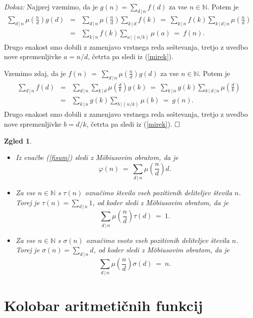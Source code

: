\documentclass[a4paper,12pt]{article}
\def\N{\mathbb{N}} %
\def\qed{$\hfill\Box$}   %
\newtheorem{zgled}{Zgled}
\begin{document}
\noindent
{\em Dokaz:\/} 
Najprej vzemimo, da je $g(n) = \sum_{d\,|\,n} f(d)$ za vse $n \in \N$. Potem je
\begin{eqnarray*}
\sum_{d\,|\,n} \mu\left(\frac{n}{d}\right)g(d)
 &=& \sum_{d\,|\,n} \mu\left(\frac{n}{d}\right)\sum_{k\,|\,d} f(k)
\ =\ \sum_{k\,|\,n} f(k) \sum_{k\,|\,d\,|\,n} \mu\left(\frac{n}{d}\right) \\
 &=& \sum_{k\,|\,n} f(k) \sum_{a\,|\,(n/k)} \mu\left(a\right)\ =\ f(n).
 \end{eqnarray*}
Drugo enakost smo dobili z zamenjavo vrstnega reda seštevanja, tretjo z uvedbo nove spremenljivke $a = n/d$,
četrta pa sledi iz (\ref{mirek}).

Vzemimo zdaj, da je $f(n)\ =\ \sum_{d\,|\,n} \mu\left(\frac{n}{d}\right)g(d)$ za vse $n \in \N$. Potem je
\begin{eqnarray*}
\sum_{d\,|\,n} f(d)
 &=& \sum_{d\,|\,n} \sum_{k\,|\,d} \mu\left(\frac{d}{k}\right) g(k)
\ =\ \sum_{k\,|\,n} g(k) \sum_{k\,|\,d\,|\,n} \mu\left(\frac{d}{k}\right) \\
 &=& \sum_{k\,|\,n} g(k) \sum_{b\,|\,(n/k)} \mu\left(b\right)\ =\ g(n).
 \end{eqnarray*}
Drugo enakost smo dobili z zamenjavo vrstnega reda seštevanja, tretjo z uvedbo nove spremenljivke $b = d/k$,
četrta pa sledi iz (\ref{mirek}). \qed


\begin{zgled}
\label{tau}
\begin{itemize}
\item Iz enačbe (\ref{fisum}) sledi z M\"obiusovim obratom, da je 
\[
\varphi(n)\ =\ \sum_{d\,|\,n}\mu\left(\frac{n}{d}\right)d.
\]
\item Za vse $n \in \N$ s $\tau(n)$ označimo število vseh pozitivnih deliteljev števila $n$.
Torej je $\tau(n) = \sum_{d\,|\,n} 1$, od koder sledi z M\"obiusovim obratom, da je 
\[
\sum_{d\,|\,n}\mu\left(\frac{n}{d}\right)\tau(d)\ =\ 1.
\]
\item Za vse $n \in \N$ s $\sigma(n)$ označimo vsoto vseh pozitivnih deliteljev števila $n$.
Torej je $\sigma(n) = \sum_{d\,|\,n} d$, od koder sledi z M\"obiusovim obratom, da je 
\[
\sum_{d\,|\,n}\mu\left(\frac{n}{d}\right)\sigma(d)\ =\ n.
\]
\end{itemize}
\end{zgled}








\section{Kolobar aritmetičnih funkcij}
\end{document}
